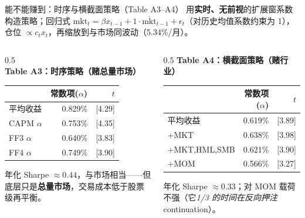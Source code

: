 \documentclass[aspectratio=169,10pt]{beamer}
\newcommand{\tabnote}[1]{\vspace{2pt}{\scriptsize\textcolor{gray!70!black}{#1}}}
\newcommand{\tighttable}{\scriptsize\setlength{\tabcolsep}{3pt}\renewcommand{\arraystretch}{1.12}}
\begin{document}
\begin{frame}{能不能赚到：时序与横截面策略（Table A3--A4）}
	用\textbf{实时、无前视}的扩展窗系数构造策略；回归式 $\mathrm{mkt}_t=\beta x_{t-1}+1\cdot\overline{\mathrm{mkt}}_{t-1}+\epsilon_t$（对历史均值系数约束为 1），仓位 $\propto c_t x_t$，再缩放到与市场同波动（5.34\%/月）。
	\begin{columns}[t]
		\begin{column}{0.5\textwidth}
			\textbf{Table A3：时序策略（赌总量市场）}
			\tighttable
			\begin{tabular}{lrr}
				\toprule
				& 常数项($\alpha$) & $t$ \\
				\midrule
				平均收益 & 0.829\% & [4.29] \\
				CAPM $\alpha$ & 0.753\% & [4.35] \\
				FF3 $\alpha$ & 0.640\% & [3.83] \\
				FF4 $\alpha$ & 0.749\% & [3.90] \\
				\bottomrule
			\end{tabular}
			\par\vspace{2pt}
			\scriptsize 年化 Sharpe $\approx 0.44$，与市场相当——但底层只是\textbf{总量市场}，交易成本低于股票级再平衡。
		\end{column}
		\begin{column}{0.5\textwidth}
			\textbf{Table A4：横截面策略（赌行业）}
			\tighttable
			\begin{tabular}{lrr}
				\toprule
				& 常数项($\alpha$) & $t$ \\
				\midrule
				平均收益 & 0.619\% & [3.89] \\
				+MKT & 0.638\% & [3.98] \\
				+MKT,HML,SMB & 0.621\% & [3.90] \\
				+MOM & 0.566\% & [3.27] \\
				\bottomrule
			\end{tabular}
			\par\vspace{2pt}
			\scriptsize 年化 Sharpe $\approx 0.33$；对 MOM 载荷不强（它\emph{1/3 的时间在反向押注} continuation）。
		\end{column}
	\end{columns}
	\vspace{3pt}
	\tabnote{回归系数本身即多空组合收益（Fama--MacBeth 1973）；本节是为剔除权重中的前视偏误而显式构造实时组合。}
\end{frame}
\end{document}
